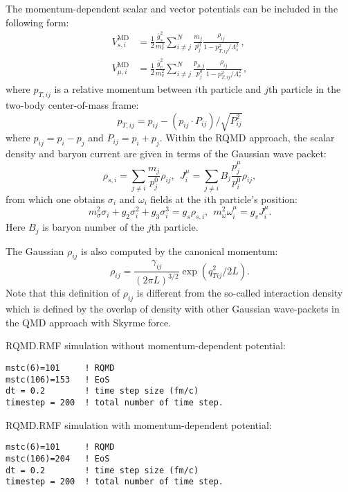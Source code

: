 \documentclass[]{article}
\begin{document}
The momentum-dependent scalar and vector potentials can be included
in the following form:
\begin{align}
  V_{s,i}^\mathrm{MD} &= \frac{1}{2}\frac{\bar{g}_s^2}{m_s^2}
       \sum_{i\ne j}^N \frac{m_j}{p^0_j}
       \frac{\rho_{ij}}{1-p_{T,ij}^2/\Lambda_s^2 }\,, \\
  V_{\mu,i}^\mathrm{MD} &= \frac{1}{2}\frac{\bar{g}_v^2}{m_v^2}
       \sum_{i\ne j}^N \frac{p_{\mu,j}}{p^0_j}
       \frac{\rho_{ij}}{1-p_{T,ij}^2/\Lambda_v^2}\,,
  \label{eq:mdqmd}
\end{align}
where $p_{T,ij}$ is a relative momentum between
$i$th particle and $j$th particle in the two-body
center-of-mass frame:
\begin{equation}
p_{T,ij}= p_{ij} -  (p_{ij}\cdot P_{ij})/\sqrt{P_{ij}^2}
\end{equation}
where $p_{ij}=p_i-p_j$ and $P_{ij}=p_i+p_j$.
%
Within the RQMD approach,
the scalar density and baryon current
are given in terms of the Gaussian wave packet:
\begin{equation}
\rho_{s,i}=\sum_{j\neq i} \frac{m_j}{p_j^0}\rho_{ij},~~
J^\mu_i=\sum_{j\neq i}B_j \frac{p^\mu_j}{p^0_i} \rho_{ij} ,
\label{eq:density}
\end{equation}
from which one obtains $\sigma_i$ and $\omega_i$ fields
at the $i$th particle's position:
\begin{equation}
 m^2_\sigma\sigma_i + g_2\sigma^2_i + g_3\sigma^3_i = g_s \rho_{s,i},~~
 m^2_\omega \omega_i^\mu = g_v J_i^\mu.
\end{equation}
Here $B_j$ is baryon number of the $j$th particle.

The Gaussian $\rho_{ij}$ is
also computed by the canonical momentum:
\begin{equation}
  \rho_{ij}=\frac{\gamma_{ij}}{(2\pi L)^{3/2}}\exp(q^2_{Tij}/2L) .
\end{equation}
Note that this definition of $\rho_{ij}$ is different from
the so-called interaction density which is defined by
the overlap of density with other Gaussian wave-packets
in the QMD approach with Skyrme force.



\bigskip
RQMD.RMF simulation without momentum-dependent potential:
\begin{verbatim}
mstc(6)=101     ! RQMD
mstc(106)=153   ! EoS
dt = 0.2        ! time step size (fm/c)
timestep = 200  ! total number of time step.
\end{verbatim}

RQMD.RMF simulation with momentum-dependent potential:
\begin{verbatim}
mstc(6)=101     ! RQMD
mstc(106)=204   ! EoS
dt = 0.2        ! time step size (fm/c)
timestep = 200  ! total number of time step.
\end{verbatim}
\end{document}
